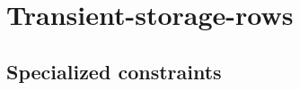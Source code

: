\section{Transient-storage-rows}
\subsection{Specialized constraints \lispTodo{}}         \label{hub: transient storage: specialized constraints}    
